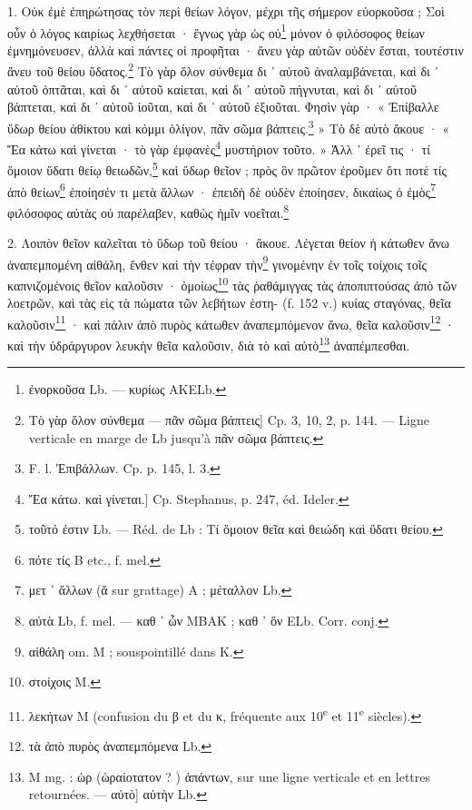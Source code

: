 \documentclass[a4paper, 11pt, oneside, polutonikogreek, french]{article}
\begin{document}
1. Οὐκ ἐμὲ ἐπηρώτησας τὸν περὶ θείων λόγον, μέχρι τῆς σήμερον εὐορκοῦσα ; Σοὶ οὖν ὁ λόγος καιρίως λεχθήσεται · ἔγνως γὰρ ὡς οὐ\footnote{ἐνορκοῦσα Lb. --- κυρίως AKELb.} μόνον ὁ φιλόσοφος θείων ἐμνημόνευσεν, ἀλλὰ καὶ πάντες οἱ προφῆται · ἄνευ γὰρ αὐτῶν οὐδὲν ἔσται, τουτέστιν ἄνευ τοῦ θείου ὕδατος.\footnote{Τὸ γὰρ ὅλον σύνθεμα --- πᾶν σῶμα βάπτεις] Cp. 3, 10, 2, p. 144. --- Ligne verticale en marge de Lb jusqu'à πᾶν σῶμα βάπτεις.} Τὸ γὰρ ὅλον σύνθεμα δι ᾽ αὐτοῦ ἀναλαμβάνεται, καὶ δι ᾽ αὐτοῦ ὀπτᾶται, καὶ δι ᾽ αὐτοῦ καίεται, καὶ δι ᾽ αὐτοῦ πήγνυται, καὶ δι ᾽ αὐτοῦ βάπτεται, καὶ δι ᾽ αὐτοῦ ἰοῦται, καὶ δι ᾽ αὐτοῦ ἐξιοῦται. Φησὶν γὰρ · « Ἐπίβαλλε ὕδωρ θείου ἀθίκτου καὶ κόμμι ὀλίγον, πᾶν σῶμα βάπτεις.\footnote{F. l. Ἐπιβάλλων. Cp. p. 145, l. 3.} » Τὸ δὲ αὐτὸ ἄκουε · « Ἔα κάτω καὶ γίνεται · τὸ γὰρ ἐμφανὲς\footnote{Ἔα κάτω. καὶ γίνεται.] Cp. Stephanus, p. 247, éd. Ideler.} μυστήριον τοῦτο. » Ἀλλ ᾽ ἐρεῖ τις · τί ὅμοιον ὕδατι θείῳ θειωδῶν,\footnote{τοῦτό ἐστιν Lb. --- Réd. de Lb : Τί ὅμοιον θεῖα καὶ θειώδη καὶ ὕδατι θείου.} καὶ ὕδωρ θεῖον ; πρὸς ὃν πρῶτον ἐροῦμεν ὅτι ποτέ τίς ἀπὸ θείων\footnote{πότε τίς B etc., f. mel.} ἐποίησέν τι μετὰ ἄλλων · ἐπειδὴ δὲ οὐδὲν ἐποίησεν, δικαίως ὁ ἐμὸς\footnote{μετ ᾽ ἄλλων (ἄ sur grattage) A ; μέταλλον Lb.} φιλόσοφος αὐτὰς οὐ παρέλαβεν, καθὼς ἡμῖν νοεῖται.\footnote{αὐτὰ Lb, f. mel. --- καθ ᾽ ὧν MBAK ; καθ ᾽ ὃν ELb. Corr. conj.}

2. Λοιπὸν θεῖον καλεῖται τὸ ὕδωρ τοῦ θείου · ἄκουε. Λέγεται θείον ἡ κάτωθεν ἄνω ἀναπεμπομένη αἰθάλη, ἔνθεν καὶ τὴν τέφραν τὴν\footnote{αἰθάλη om. M ; souspointillé dans K.} γινομένην ἐν τοῖς τοίχοις τοῖς καπνιζομένοις θεῖον καλοῦσιν · ὁμοίως\footnote{στοίχοις M.} τὰς ῥαθάμιγγας τὰς ἀποπιπτούσας ἀπὸ τῶν λοετρῶν, καὶ τὰς εἰς τὰ πώματα τῶν λεβήτων ἑστη- (f. 152 v.) κυίας σταγόνας, θεῖα καλοῦσιν\footnote{λεκήτων M (confusion du β et du κ, fréquente aux 10\textsuperscript{e} et 11\textsuperscript{e} siècles).} · καὶ πάλιν ἀπὸ πυρὸς κάτωθεν ἀναπεμπόμενον ἄνω, θεῖα καλοῦσιν\footnote{τὰ ἀπὸ πυρὸς ἀναπεμπόμενα Lb.} · καὶ τὴν ὑδράργυρον λευκὴν θεῖα καλοῦσιν, διὰ τὸ καὶ αὐτὸ\footnote{M mg. : ὡρ (ὡραίοτατον ? ) ἁπάντων, sur une ligne verticale et en lettres retournées. --- αὐτὸ] αὐτὴν Lb.} ἀναπέμπεσθαι.
\end{document}
